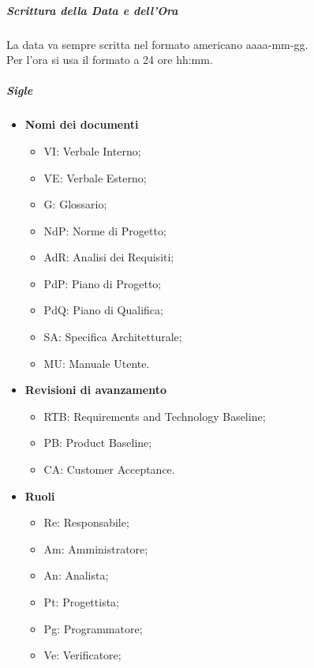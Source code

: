 \subparagraph*{Scrittura della Data e dell'Ora} \hfill \break
La data va sempre scritta nel formato americano aaaa-mm-gg. \\
Per l'ora si usa il formato a 24 ore hh:mm.

\subparagraph*{Sigle}
\begin{itemize}
        \item \textbf{Nomi dei documenti}
                \begin{itemize}
                        \item VI: Verbale Interno;
                        \item VE: Verbale Esterno;
                        \item G: Glossario;
                        \item NdP: Norme di Progetto;
                        \item AdR: Analisi dei Requisiti;
                        \item PdP: Piano di Progetto;
                        \item PdQ: Piano di Qualifica;
                        \item SA: Specifica Architetturale;
                        \item MU: Manuale Utente.
                \end{itemize}
        \item \textbf{Revisioni di avanzamento}
                \begin{itemize}
                        \item RTB: Requirements and Technology Baseline;
                        \item PB: Product Baseline;
                        \item CA: Customer Acceptance.
                \end{itemize}
        \item \textbf{Ruoli}
                \begin{itemize}
                        \item Re: Responsabile;
                        \item Am: Amministratore;
                        \item An: Analista;
                        \item Pt: Progettista;
                        \item Pg: Programmatore;
                        \item Ve: Verificatore;
                \end{itemize}
\end{itemize}


